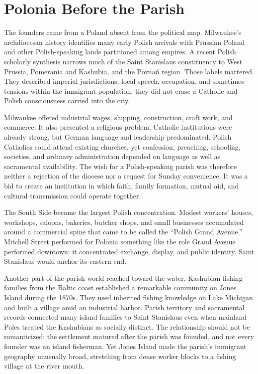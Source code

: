 \section{Polonia Before the Parish}

The founders came from a Poland absent from the political map. Milwaukee's archdiocesan history identifies many early Polish arrivals with Prussian Poland and other Polish-speaking lands partitioned among empires. A recent Polish scholarly synthesis narrows much of the Saint Stanislaus constituency to West Prussia, Pomerania and Kashubia, and the Poznań region. Those labels mattered. They described imperial jurisdictions, local speech, occupation, and sometimes tensions within the immigrant population; they did not erase a Catholic and Polish consciousness carried into the city.

Milwaukee offered industrial wages, shipping, construction, craft work, and commerce. It also presented a religious problem. Catholic institutions were already strong, but German language and leadership predominated. Polish Catholics could attend existing churches, yet confession, preaching, schooling, societies, and ordinary administration depended on language as well as sacramental availability. The wish for a Polish-speaking parish was therefore neither a rejection of the diocese nor a request for Sunday convenience. It was a bid to create an institution in which faith, family formation, mutual aid, and cultural transmission could operate together.

The South Side became the largest Polish concentration. Modest workers' houses, workshops, saloons, bakeries, butcher shops, and small businesses accumulated around a commercial spine that came to be called the ``Polish Grand Avenue.'' Mitchell Street performed for Polonia something like the role Grand Avenue performed downtown: it concentrated exchange, display, and public identity. Saint Stanislaus would anchor its eastern end.

Another part of the parish world reached toward the water. Kashubian fishing families from the Baltic coast established a remarkable community on Jones Island during the 1870s. They used inherited fishing knowledge on Lake Michigan and built a village amid an industrial harbor. Parish territory and sacramental records connected many island families to Saint Stanislaus even when mainland Poles treated the Kashubians as socially distinct. The relationship should not be romanticized: the settlement matured after the parish was founded, and not every founder was an island fisherman. Yet Jones Island made the parish's immigrant geography unusually broad, stretching from dense worker blocks to a fishing village at the river mouth.

